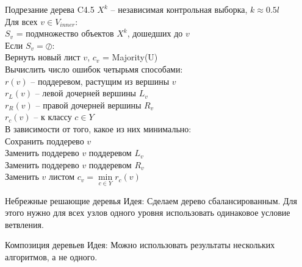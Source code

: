 \documentclass[10pt]{beamer}
\begin{document}
{
\begin{frame}{Подрезание дерева C4.5}
  $X^k$ -- независимая контрольная выборка, $k \approx 0.5l$\\
	Для всех $v \in V_{inner}$:\\
		\hspace{10mm} $S_v$ = подмножество объектов $X^k$, дошедших до $v$\\
		\hspace{10mm} Если $S_v = \oslash$:\\
		  \hspace{20mm} Вернуть новый лист $v$, $c_v$ = Majority(U)\\
		\hspace{10mm} Вычислить число ошибок четырьмя способами:\\
			\hspace{20mm} $r(v)$ -- поддеревом, растущим из вершины $v$\\
			\hspace{20mm} $r_L(v)$ -- левой дочерней вершины $L_v$\\
			\hspace{20mm} $r_R(v)$ -- правой дочерней вершины $R_v$\\
			\hspace{20mm} $r_c(v)$ -- к классу $c \in Y$\\
		\hspace{10mm} В зависимости от того, какое из них минимально:\\
			\hspace{20mm} Сохранить поддерево $v$\\
			\hspace{20mm} Заменить поддерево $v$ поддеревом $L_v$\\
			\hspace{20mm} Заменить поддерево $v$ поддеревом $R_v$\\
			\hspace{20mm} Заменить $v$ листом $c_v = \min\limits_{c \in Y} r_c(v)$\\
\end{frame}
}

{
\begin{frame}{Небрежные решающие деревья}
  \alert{Идея}: Сделаем дерево сбалансированным. Для этого нужно для всех узлов одного уровня использовать одинаковое условие ветвления.
\end{frame}
}

\begin{frame}{Композиция деревьев}
  \alert{Идея}: Можно использовать результаты нескольких	алгоритмов, а не одного.
\end{frame}
\end{document}
